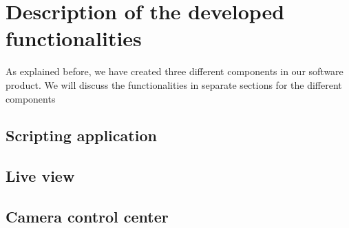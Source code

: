\section{Description of the developed functionalities}

As explained before, we have created three different components in our software product. We will discuss the functionalities in separate sections for the different components

\subsection*{Scripting application}


\subsection*{Live view}

\subsection*{Camera control center}
